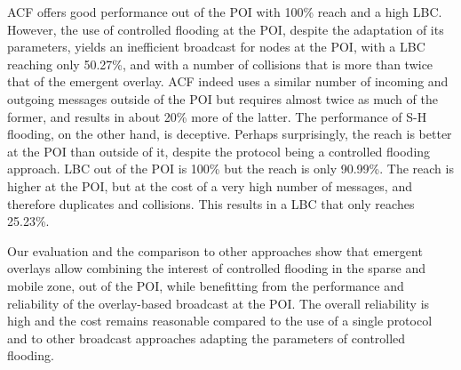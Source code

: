 ACF offers good performance out of the POI with 100\% reach and a high LBC.
However, the use of controlled flooding at the POI, despite the adaptation of its parameters, yields an inefficient broadcast for nodes at the POI, with a LBC reaching only 50.27\%, and with a number of collisions that is more than twice that of the emergent overlay.
ACF indeed uses a similar number of incoming and outgoing messages outside of the POI but requires almost twice as much of the former, and results in about 20\% more of the latter.
The performance of S-H flooding, on the other hand, is deceptive.
Perhaps surprisingly, the reach is better at the POI than outside of it, despite the protocol being a controlled flooding approach.
LBC out of the POI is 100\% but the reach is only 90.99\%.
The reach is higher at the POI, but at the cost of a very high number of messages, and therefore duplicates and collisions.
This results in a LBC that only reaches 25.23\%.

Our evaluation and the comparison to other approaches show that emergent overlays allow combining the interest of controlled flooding in the sparse and mobile zone, out of the POI, while benefitting from the performance and reliability of the overlay-based broadcast at the POI.
The overall reliability is high and the cost remains reasonable compared to the use of a single protocol and to other broadcast approaches adapting the parameters of controlled flooding.
